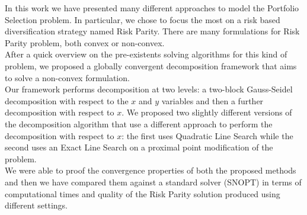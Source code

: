 In this work we have presented many different approaches to model the Portfolio Selection problem. In particular, we chose to focus the most on a risk based diversification strategy named Risk Parity. There are many formulations for Risk Parity problem, both convex or non-convex.\\ After a quick overview on the pre-existents solving algorithms for this kind of problem, we proposed a globally convergent decomposition framework that aims to solve a non-convex formulation.\\ Our framework performs decomposition at two levels: a two-block Gauss-Seidel decomposition with respect to the $x$ and $y$ variables and then a further decomposition with respect to $x$. We proposed two slightly different versions of the decomposition algorithm that use a different approach to perform the decomposition with respect to $x$: the first uses Quadratic Line Search while the second uses an Exact Line Search on a proximal point modification of the problem.\\ We were able to proof the convergence properties of both the proposed methods and then we have compared them against a standard solver (SNOPT) in terms of computational times and quality of the Risk Parity solution produced using different settings. 